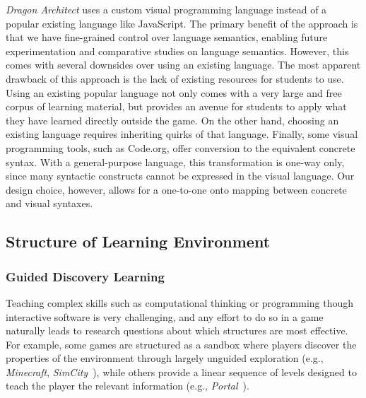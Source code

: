 \documentclass{sig-alternate}
\newcommand{\gametitle}{{\emph{Dragon Architect}}}
\begin{document}
\gametitle{} uses a custom visual programming language instead of a popular existing language like JavaScript.
The primary benefit of the approach is that we have fine-grained control over language semantics, enabling future experimentation and comparative studies on language semantics.
However, this comes with several downsides over using an existing language.
The most apparent drawback of this approach is the lack of existing resources for students to use.
Using an existing popular language not only comes with a very large and free corpus of learning material, but provides an avenue for students to apply what they have learned directly outside the game.
On the other hand, choosing an existing language requires inheriting quirks of that language.
Finally, some visual programming tools, such as Code.org, offer conversion to the equivalent concrete syntax.
With a general-purpose language, this transformation is one-way only, since many syntactic constructs cannot be expressed in the visual language. Our design choice, however, allows for a one-to-one onto mapping between concrete and visual syntaxes.


\subsection{Structure of Learning Environment}

\subsubsection{Guided Discovery Learning}
\label{sec:guided_discovery_theory}

Teaching complex skills such as computational thinking or programming though interactive software is very challenging, and any effort to do so in a game naturally leads to research questions about which structures are most effective.
For example, some games are structured as a sandbox where players discover the properties of the environment through largely unguided exploration (e.g., \emph{Minecraft}, \emph{SimCity}~\cite{simcity}), while others provide a linear sequence of levels designed to teach the player the relevant information (e.g., \emph{Portal}~\cite{portal}). 
\end{document}
